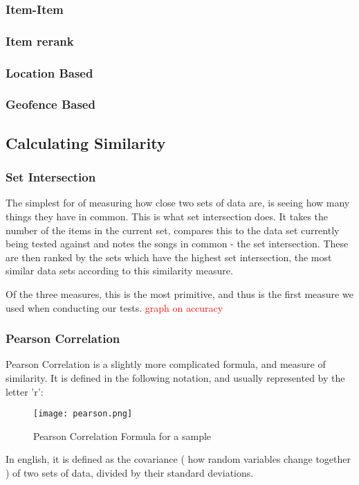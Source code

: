 \documentclass[12pt]{article}
\newcommand\todo[1]{\textcolor{red}{#1}}
\begin{document}
		\subsubsection{Item-Item}
		\subsubsection{Item rerank}
		\subsubsection{Location Based}
		\subsubsection{Geofence Based}
	\subsection{Calculating Similarity}
		  \subsubsection{Set Intersection}
			The simplest for of measuring how close two sets of data are, is seeing how many things they have in common. This is what set intersection does. It takes the number of the items in the current set, compares this to the data set currently being tested against and notes the songs in common - the set intersection. These are then ranked by the sets which have the highest set intersection, the most similar data sets according to this similarity measure.
			
Of the three measures, this is the most primitive, and thus is the first measure we used when conducting our tests. 			   		  
		 \todo{ graph on accuracy}
		  \subsubsection{Pearson Correlation}
Pearson Correlation is a slightly more complicated formula, and measure of similarity. It is defined in the following notation, and usually represented by the letter 'r':
		
\begin{figure}[ht!]
\centering
\texttt{[image: pearson.png]}
\caption{Pearson Correlation Formula for a sample}
\label{overflow}
\end{figure}

In english, it is defined as the covariance ( how random variables change together ) of two sets of data, divided by their standard deviations. 
	  
\end{document}
